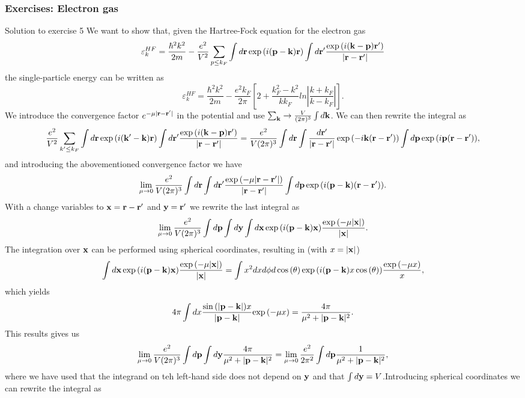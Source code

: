 \documentclass{beamer}
\begin{document}
\begin{frame}
\frametitle{Exercises: Electron gas}

\begin{block}{Solution to exercise 5 }
We want to show that, given the Hartree-Fock equation for the electron gas
\[
\varepsilon_{k}^{HF}=\frac{\hbar^{2}k^{2}}{2m}-\frac{e^{2}}
{V^{2}}\sum_{p\leq
k_{F}}\int d{\bf r}\exp{(i({\bf p}-{\bf k}){\bf r})}\int
d{\bf r}'\frac{\exp{(i({\bf k}-{\bf p}){\bf r}'})}
{\vert{\bf r}-{\bf r'}\vert}
\]
the single-particle energy can be written as
\[
\varepsilon_{k}^{HF}=\frac{\hbar^{2}k^{2}}{2m}-\frac{e^{2}
k_{F}}{2\pi}
\left[
2+\frac{k_{F}^{2}-k^{2}}{kk_{F}}ln\left\vert\frac{k+k_{F}}
{k-k_{F}}\right\vert
\right].
\]
We introduce the convergence factor 
$e^{-\mu\vert{\bf r}-{\bf r}'\vert}$
in the potential and use  $\sum_{{\bf k}}\rightarrow
\frac{V}{(2\pi)^{3}}\int d{\bf k}$. We can then rewrite the integral as 
\[
\frac{e^{2}}
{V^{2}}\sum_{k'\leq
k_{F}}\int d{\bf r}\exp{(i({\bf k'}-{\bf k}){\bf r})}\int
d{\bf r}'\frac{\exp{(i({\bf k}-{\bf p}){\bf r}'})}
{\vert{\bf r}-{\bf r'}\vert}=\frac{e^{2}}{V (2\pi)^3}  \int d{\bf r}\int
\frac{d{\bf r}'}{\vert{\bf r}-{\bf r'}\vert}\exp{(-i{\bf k}({\bf r}-{\bf r}'))}\int d{\bf p}\exp{(i{\bf p}({\bf r}-{\bf r}'))},
\]
and introducing the abovementioned convergence factor we have
\[
\lim_{\mu \to 0}\frac{e^{2}}{V (2\pi)^3}  \int d{\bf r}\int d{\bf r}'\frac{\exp{(-\mu\vert{\bf r}-{\bf r}'\vert})}{\vert{\bf r}-{\bf r'}\vert}\int d{\bf p}\exp{(i({\bf p}-{\bf k})({\bf r}-{\bf r}'))}.
\]
With a change variables to ${\bf x} = {\bf r}-{\bf r}'$ and ${\bf y}={\bf r}'$ we rewrite the last integral as
\[
\lim_{\mu \to 0}\frac{e^{2}}{V (2\pi)^3}  \int d{\bf p}\int d{\bf y}\int d{\bf x}\exp{(i({\bf p}-{\bf k}){\bf x})}\frac{\exp{(-\mu\vert{\bf x}\vert})}{\vert{\bf x}\vert}.
\]
The integration over ${\bf x}$ can be performed using spherical coordinates, resulting in (with $x=\vert {\bf x}\vert$)
\[
\int d{\bf x}\exp{(i({\bf p}-{\bf k}){\bf x})}\frac{\exp{(-\mu\vert{\bf x}\vert})}{\vert{\bf x}\vert}=\int x^2 dx d\phi d\cos{(\theta)}\exp{(i({\bf p}-{\bf k})x\cos{(\theta))}}\frac{\exp{(-\mu x)}}{x},
\]
which yields
\[
4\pi \int dx \frac{ \sin{(\vert {\bf p}-{\bf k}\vert)x} }{\vert {\bf p}-{\bf k}\vert}{\exp{(-\mu x)}}= \frac{4\pi}{\mu^2+\vert {\bf p}-{\bf k}\vert^2}.
\]
This results gives us 
\[
\lim_{\mu \to 0}\frac{e^{2}}{V (2\pi)^3}  \int d{\bf p}\int d{\bf y}\frac{4\pi}{\mu^2+\vert {\bf p}-{\bf k}\vert^2}=\lim_{\mu \to 0}\frac{e^{2}}{ 2\pi^2}  \int d{\bf p}\frac{1}{\mu^2+\vert {\bf p}-{\bf k}\vert^2},
\]
where we have used that the integrand on teh left-hand side does not depend on ${\bf y}$ and that $\int d{\bf y}=V$.Introducing spherical coordinates we can rewrite the integral as 

\end{block}
\end{frame}
\end{document}

